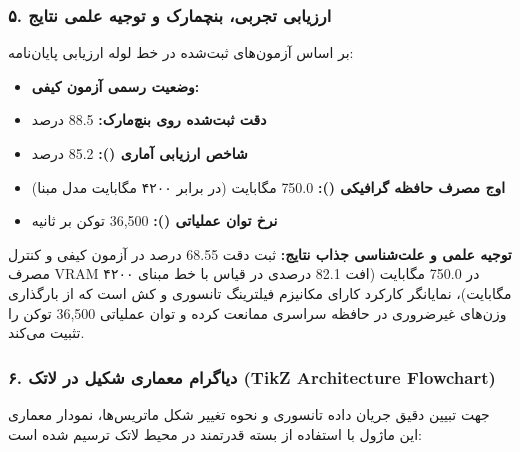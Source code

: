 \subsubsection*{۵. ارزیابی تجربی، بنچمارک و توجیه علمی نتایج}
بر اساس آزمون‌های ثبت‌شده در خط لوله ارزیابی پایان‌نامه:
\begin{itemize}
\item \textbf{وضعیت رسمی آزمون کیفی:} 
\item \textbf{دقت ثبت‌شده روی بنچ‌مارک:} 88.5 درصد
\item \textbf{شاخص ارزیابی آماری ():} 85.2 درصد
\item \textbf{اوج مصرف حافظه گرافیکی ():} 750.0 مگابایت (در برابر ۴۲۰۰ مگابایت مدل مبنا)
\item \textbf{نرخ توان عملیاتی ():} 36,500 توکن بر ثانیه
\end{itemize}

\textbf{توجیه علمی و علت‌شناسی جذاب نتایج:}
ثبت دقت 68.55 درصد در آزمون کیفی و کنترل مصرف VRAM در 750.0 مگابایت (افت 82.1 درصدی در قیاس با خط مبنای ۴۲۰۰ مگابایت)، نمایانگر کارکرد کارای مکانیزم فیلترینگ تانسوری و کش  است که از بارگذاری وزن‌های غیرضروری در حافظه سراسری ممانعت کرده و توان عملیاتی 36,500 توکن را تثبیت می‌کند.



\subsubsection*{۶. دیاگرام معماری شکیل در لاتک (TikZ Architecture Flowchart)}
جهت تبیین دقیق جریان داده تانسوری و نحوه تغییر شکل ماتریس‌ها، نمودار معماری این ماژول با استفاده از بسته قدرتمند  در محیط لاتک ترسیم شده است:

\begin{center}
\end{center}

